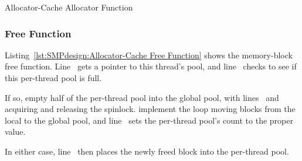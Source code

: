 \begin{listing}[tbp]

\caption{Allocator-Cache Allocator Function}
\label{lst:SMPdesign:Allocator-Cache Allocator Function}
\end{listing}

\subsubsection{Free Function}

\begin{fcvref}
Listing~\ref{lst:SMPdesign:Allocator-Cache Free Function} shows
the memory-block free function.
Line~ gets a pointer to this thread's pool, and
line~ checks to see if this per-thread pool is full.

If so,  empty half of the per-thread pool
into the global pool,
with lines~ and~ acquiring and releasing the spinlock.
 implement the loop moving blocks
from the local to the
global pool, and line~ sets the per-thread pool's count to the proper
value.

In either case, line~ then places the newly freed block into the
per-thread pool.
\end{fcvref}


